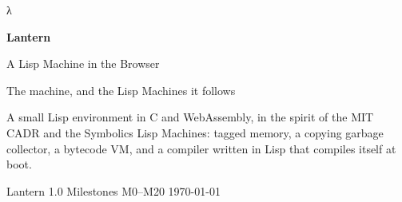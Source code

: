\documentclass[11pt,a4paper,oneside]{report}
\begin{document}
\begin{titlepage}
  \sffamily
  \vspace*{3cm}
  {\fontsize{110}{110}\selectfont λ}\par
  \vspace{1cm}
  {\fontsize{48}{48}\selectfont\bfseries Lantern\par}
  \vspace{0.6cm}
  {\Huge A Lisp Machine in the Browser\par}
  \vspace{0.8cm}
  {\Large The machine, and the Lisp Machines it follows\par}
  \vspace{1.5cm}
  {\large\color{gray} A small Lisp environment in C and WebAssembly, in the spirit of the
  MIT CADR and the Symbolics Lisp Machines: tagged memory, a copying garbage
  collector, a bytecode VM, and a compiler written in Lisp that compiles itself
  at boot.\par}
  \vfill
  {\large Lantern 1.0 \textperiodcentered{} Milestones M0–M20 \hfill \today\par}
\end{titlepage}



\tableofcontents



\end{document}
